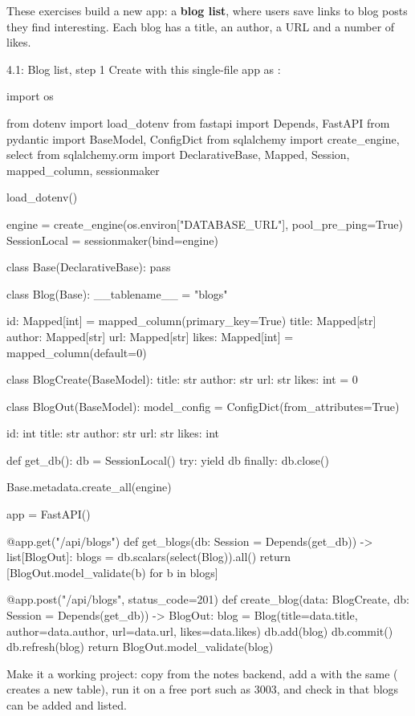 These exercises build a new app: a \textbf{blog list}, where users save links to blog posts they find interesting. Each blog has a title, an author, a URL and a number of likes.

\begin{exercise}{4.1: Blog list, step 1}
Create  with this single-file app as :

\begin{py}
import os

from dotenv import load_dotenv
from fastapi import Depends, FastAPI
from pydantic import BaseModel, ConfigDict
from sqlalchemy import create_engine, select
from sqlalchemy.orm import DeclarativeBase, Mapped, Session, mapped_column, sessionmaker

load_dotenv()

engine = create_engine(os.environ["DATABASE_URL"], pool_pre_ping=True)
SessionLocal = sessionmaker(bind=engine)


class Base(DeclarativeBase):
	pass


class Blog(Base):
	__tablename__ = "blogs"

	id: Mapped[int] = mapped_column(primary_key=True)
	title: Mapped[str]
	author: Mapped[str]
	url: Mapped[str]
	likes: Mapped[int] = mapped_column(default=0)


class BlogCreate(BaseModel):
	title: str
	author: str
	url: str
	likes: int = 0


class BlogOut(BaseModel):
	model_config = ConfigDict(from_attributes=True)

	id: int
	title: str
	author: str
	url: str
	likes: int


def get_db():
	db = SessionLocal()
	try:
		yield db
	finally:
		db.close()


Base.metadata.create_all(engine)

app = FastAPI()


@app.get("/api/blogs")
def get_blogs(db: Session = Depends(get_db)) -> list[BlogOut]:
	blogs = db.scalars(select(Blog)).all()
	return [BlogOut.model_validate(b) for b in blogs]


@app.post("/api/blogs", status_code=201)
def create_blog(data: BlogCreate, db: Session = Depends(get_db)) -> BlogOut:
	blog = Blog(title=data.title, author=data.author, url=data.url, likes=data.likes)
	db.add(blog)
	db.commit()
	db.refresh(blog)
	return BlogOut.model_validate(blog)
\end{py}

Make it a working project: copy  from the notes backend, add a  with the same  ( creates a new  table), run it on a free port such as 3003, and check in  that blogs can be added and listed.
\end{exercise}

